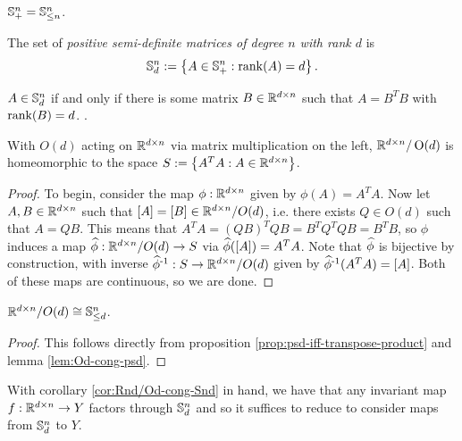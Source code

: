\begin{corollary}
    $\S^n_+ = \S^n_{\leq n}$.
\end{corollary}

\begin{definition}
    The set of \emph{positive semi-definite matrices of degree $n$ with rank $d$} is
    \[
        \S^n_d := \set{A \in \S^n_+ : \rank(A) = d}.
    \]
\end{definition}

\begin{proposition}\label{prop:psd-iff-transpose-product}
    $A \in \S^n_d$ if and only if there is some matrix $B \in \R^{d \times n}$ such that $A = B^T B$ with $\rank(B) = d$. \cite{wikipedia:definite-matrices}.
\end{proposition}

\begin{lemma}\label{lem:Od-cong-psd}
    With $O(d)$ acting on $\R^{d \times n}$ via matrix multiplication on the left, $\R^{d \times n} / \O(d)$ is homeomorphic to the space $S := \set{A^T A : A \in \R^{d \times n}}$.
    \begin{proof}

        To begin, consider the map $\phi : \R^{d \times n}$ given by $\phi(A) = A^T A$.
        Now let $A,B \in \R^{d \times n}$ such that $[A] = [B] \in \R^{d \times n} / O(d)$, i.e. there exists $Q \in O(d)$ such that $A = QB$.
        This means that $A^T A = (QB)^T QB = B^T Q^T Q B = B^T B$, so $\phi$ induces a map $\Hat{\phi} : \R^{d \times n} / O(d) \to S$ via $\Hat{\phi}([A]) = A^T A$.
        Note that $\Hat{\phi}$ is bijective by construction, with inverse $\inv{\Hat{\phi}} : S \to \R^{d \times n} / O(d)$ given by $\inv{\Hat{\phi}}(A^T A) = [A]$.
        Both of these maps are continuous, so we are done.
    \end{proof}
\end{lemma}

\begin{corollary}\label{cor:Rnd/Od-cong-Snd}
    $\R^{d \times n} / O(d) \cong \S^n_{\leq d}$.
    \begin{proof}
        This follows directly from proposition \ref{prop:psd-iff-transpose-product} and lemma \ref{lem:Od-cong-psd}.
    \end{proof}
\end{corollary}

With corollary \ref{cor:Rnd/Od-cong-Snd} in hand, we have that any invariant map $f : \R^{d \times n} \to Y$ factors through $\S^n_d$ and so it suffices to reduce to consider maps from $\S^n_d$ to $Y$.

